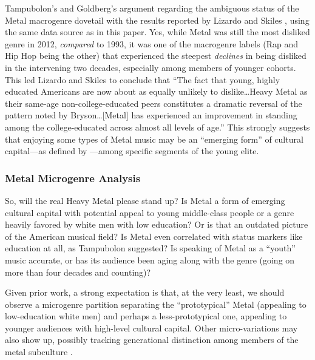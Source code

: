 \documentclass[a4paper,12pt]{extarticle}
\begin{document}
Tampubolon's and Goldberg's argument regarding the ambiguous status of the Metal macrogenre dovetail with the results reported by Lizardo and Skiles \citeyearpar{lizardo_skiles15}, using the same data source as in this paper. Yes, while Metal was still the most disliked genre in 2012, \textit{compared} to 1993, it was one of the macrogenre labels (Rap and Hip Hop being the other) that experienced the steepest \textit{declines} in being disliked in the intervening two decades, especially among members of younger cohorts. This led Lizardo and Skiles \citeyearpar[][18]{lizardo_skiles15} to conclude that ``The fact that young, highly educated Americans are now about as equally unlikely to dislike\ldots Heavy Metal as their same-age non-college-educated peers constitutes a dramatic reversal of the pattern noted by Bryson\ldots [Metal] has experienced an improvement in standing among the college-educated across almost all levels of age.'' This strongly suggests that enjoying some types of Metal music may be an ``emerging form'' of cultural capital---as defined by \citet{prieur2013emerging}---among specific segments of the young elite.  

\subsubsection{Metal Microgenre Analysis}
So, will the real Heavy Metal please stand up? Is Metal a form of emerging cultural capital with potential appeal to young middle-class people or a genre heavily favored by white men with low education? Or is that an outdated picture of the American musical field? Is Metal even correlated with status markers like education at all, as Tampubolon suggested? Is speaking of Metal as a ``youth'' music accurate, or has its audience been aging along with the genre (going on more than four decades and counting)? 

Given prior work, a strong expectation is that, at the very least, we should observe a microgenre partition separating the ``prototypical'' Metal (appealing to low-education white men) and perhaps a less-prototypical one, appealing to younger audiences with high-level cultural capital. Other micro-variations may also show up, possibly tracking generational distinction among members of the metal subculture \citep{koch2020evolutionary}.
\end{document}
